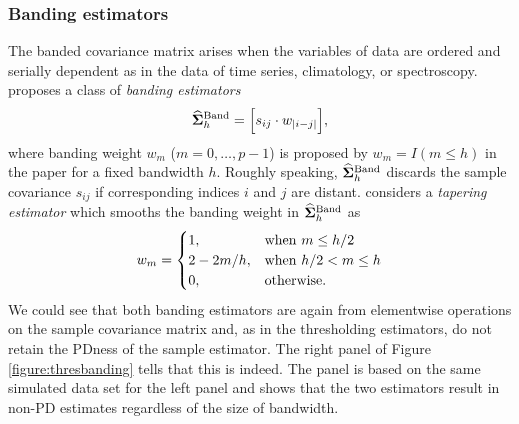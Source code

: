 \documentclass[times,sort&compress,3p]{elsarticle}
\begin{document}
\subsubsection{Banding estimators}
The banded covariance matrix arises when the variables of data are ordered and serially dependent as in the data of time series, climatology, or spectroscopy. \citet{Bickel2008} proposes a class of \emph{banding estimators}
\[
\widehat{\bf \Sigma}_h^{\rm Band} = \Big[ s_{ij} \cdot w_{|i-j|} \Big],
\]
where banding weight $w_m$ ($m = 0, \ldots, p-1$) is proposed by $w_m = I( m \leq h)$ in the paper for a fixed
 bandwidth $h$. Roughly speaking, $\widehat{\bf \Sigma}_h^{\rm Band}$ discards the sample
covariance $s_{ij}$ if corresponding indices $i$ and $j$ are distant.  \citet{Cai2010}
considers a \emph{tapering estimator} which smooths the banding weight in $\widehat{\bf \Sigma}_h^{\rm Band}$ as
\[
w_m = \begin{cases} 1, & {\rm when~} m \leq h/2 \\
	2 - 2m/h, & {\rm when~} h/2 < m \leq h \\
	0, & {\rm otherwise}.
	\end{cases}
\]
We could see that both banding estimators are again from elementwise operations on
the sample covariance matrix and, as in the thresholding estimators, do not
retain the PDness of the sample estimator.
The right panel of Figure \ref{figure:thresbanding} tells that this is indeed. The
panel is based on the same simulated data set for the left panel and
shows that the two estimators result in non-PD estimates regardless
of the size of bandwidth.
\end{document}
